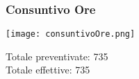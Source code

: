 \begin{frame}
  \frametitle{Consuntivo Ore}
  \texttt{[image: consuntivoOre.png]}

	Totale preventivate: 735 \\
	Totale effettive: 735
\end{frame}
